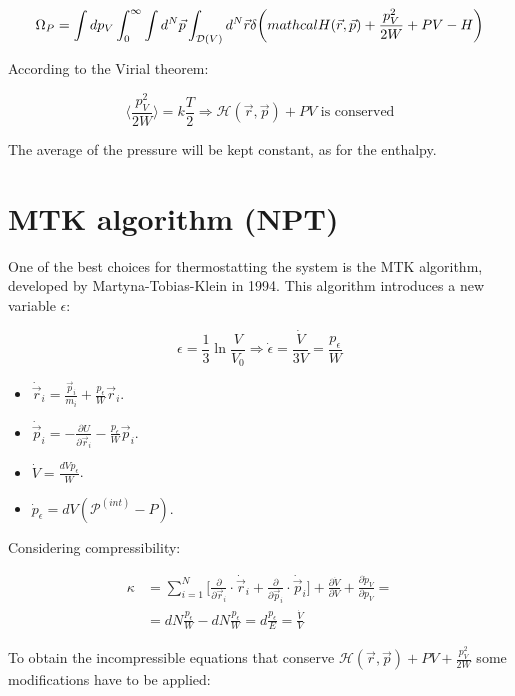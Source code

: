 	$$\Omega_P = \int dp_V\int_0^{\infty}\int d^N\vec{p}\int_{\mathcal{D}(V)}d^N\vec{r}\delta\biggl(\\mathcal{H}(\vec{r},\vec{p}) + \frac{p_V^2}{2W}+PV-H\biggr)$$

	According to the Virial theorem:

	$$\biggl\langle\frac{p_V^2}{2W}\biggr\rangle = k\frac{T}{2}\Rightarrow \mathcal{H}(\vec{r},\vec{p}) + PV\text{ is conserved}$$

	The average of the pressure will be kept constant, as for the enthalpy.

\section{MTK algorithm (NPT)}
One of the best choices for thermostatting the system is the MTK algorithm, developed by Martyna-Tobias-Klein in 1994.
This algorithm introduces a new variable $\epsilon$:

$$\epsilon = \frac{1}{3}\ln\frac{V}{V_0}\Rightarrow\dot{\epsilon} = \frac{\dot{V}}{3V}=\frac{p_\epsilon}{W}$$

\begin{multicols}{2}
	\begin{itemize}
		\item $\dot{\vec{r}}_i = \frac{\vec{p}_i}{m_i} + \frac{p_\epsilon}{W}\vec{r}_i$.
		\item $\dot{\vec{p}}_i = -\frac{\partial U}{\partial\vec{r}_i} - \frac{p_\epsilon}{W}\vec{p}_i$.
		\item $\dot{V} = \frac{dVp_\epsilon}{W}$.
		\item $\dot{p}_\epsilon = dV(\mathcal{P}^{(int)}-P)$.
	\end{itemize}
\end{multicols}


Considering compressibility:

\begin{align*}
	\kappa & = \sum\limits_{i=1}^N\biggl[\frac{\partial}{\partial\vec{r}_i}\cdot\dot{\vec{r}}_i + \frac{\partial}{\partial\vec{p}_i}\cdot\dot{\vec{p}}_i\biggr] + \frac{\partial\dot{V}}{\partial V} + \frac{\partial\dot{p}_V}{\partial p_V} = \\
				 &= dN\frac{p_\epsilon}{W}-dN\frac{p_\epsilon}{W} = d\frac{p_\epsilon}{E} = \frac{\dot{V}}{V}
\end{align*}

To obtain the incompressible equations that conserve $\mathcal{H}(\vec{r},\vec{p}) + PV + \frac{p_V^2}{2W}$ some modifications have to be applied:

